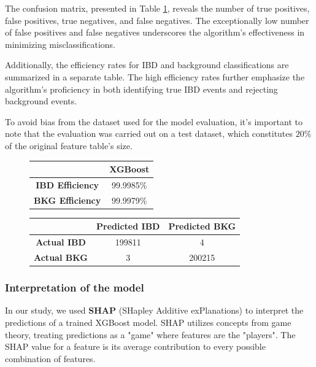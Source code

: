 The confusion matrix, presented in Table \ref{tab:conf_matrix_xgb}, reveals the number of true positives, false positives, true negatives, and false negatives. The exceptionally low number of false positives and false negatives underscores the algorithm's effectiveness in minimizing misclassifications.

Additionally, the efficiency rates for IBD and background classifications are summarized in a separate table. The high efficiency rates further emphasize the algorithm's proficiency in both identifying true IBD events and rejecting background events.

To avoid bias from the dataset used for the model evaluation, it's important to note that the evaluation was carried out on a test dataset, which constitutes $20\%$ of the original feature table's size.

\begin{figure}[h!]
	\centering
	\begin{minipage}{0.33\textwidth}
	\centering
	\begin{tabular}{cc}
		\toprule
		& \textbf{XGBoost} \\
		\midrule
		\textbf{IBD Efficiency} & 99.9985\% \\
		\textbf{BKG Efficiency} & 99.9979\% \\
		\bottomrule
	\end{tabular}
	\end{minipage}
	\begin{minipage}{0.65\textwidth}
	\centering
	\begin{tabular}{ccc}
		\toprule
		& \textbf{Predicted IBD} & \textbf{Predicted BKG} \\
		\midrule
		\textbf{Actual IBD} & 199811 & 4 \\
		\textbf{Actual BKG} & 3 & 200215 \\
		\bottomrule
	\end{tabular}
	\label{tab:conf_matrix_xgb}
\end{minipage}
\end{figure}




\subsubsection{Interpretation of the model}
In our study, we used \textbf{SHAP} (SHapley Additive exPlanations) to interpret the predictions of a trained XGBoost model. SHAP utilizes concepts from game theory, treating predictions as a "game" where features are the "players". The SHAP value for a feature is its average contribution to every possible combination of features.

